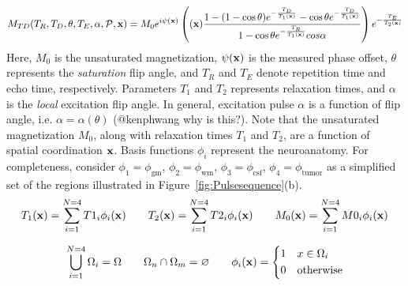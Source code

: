 \documentclass{article}         %
\theoremstyle{definition}
\theoremstyle{remark}
\begin{document}
\begin{equation}\label{mtd}
M_{TD}(T_R,T_D,\theta,T_E,\alpha,\mathcal{P},\mathbf{x})=
   M_0 e^{i\psi(\mathbf{x})}
\left(
 (\mathbf{x})\frac{1-(1-\cos \theta)e^{-\frac{T_D}{T_1(\mathbf{x})}}-\cos \theta e^{-\frac{T_D}{T_1(\mathbf{x})}}}{1-\cos \theta e^{-\frac{T_R}{T_1(\mathbf{x})}}cos \alpha}
 \right) e^{-\frac{T_E}{T_2(\mathbf{x})}}
\end{equation}
Here, $M_0$ is the unsaturated magnetization, $\psi(\mathbf{x})$ is the measured phase offset,
$\theta$ represents the \textit{saturation} flip
angle, and $T_R$ and $T_E$ denote repetition time and echo time, respectively.
Parameters $T_1$ and $T_2$ represents relaxation times, and $\alpha$ is the
\textit{local} excitation flip angle. 
In general, excitation pulse $\alpha$ is a function of flip angle, i.e.
$\alpha=\alpha(\theta)$
{\color{red}(@kenphwang why is this?)}.
Note that the unsaturated magnetization $M_0$, along with
relaxation times $T_1$ and $T_2$, are a function of spatial coordination $\mathbf{x}$.
Basis functions $\phi_i$ represent the neuroanatomy. For completeness, consider
$\phi_1 = \phi_\text{gm}$,
$\phi_2 = \phi_\text{wm}$,
$\phi_3 = \phi_\text{csf}$,
$\phi_4 = \phi_\text{tumor}$ as a simplified set 
of the regions illustrated in Figure~\ref{fig:Pulsesequence}(b).
\[
T_1(\mathbf{x})=\sum_{i=1}^{N=4} T1_i \phi_i(\mathbf{x})
\qquad
T_2(\mathbf{x})=\sum_{i=1}^{N=4} T2_i \phi_i(\mathbf{x})
\qquad
M_0(\mathbf{x})=\sum_{i=1}^{N=4} M0_i \phi_i(\mathbf{x})
\]
	
	
\[
\bigcup_{i=1}^{N=4}\Omega_i=\Omega  \qquad  \Omega_n\cap\Omega_m=\varnothing
\qquad 
\phi_i(\mathbf{x})=\left\{ \begin{split}
			1 & \quad x\in\Omega_i \\
			0 & \quad \text{otherwise}
                     \end{split} \right. 
\]
\end{document}
